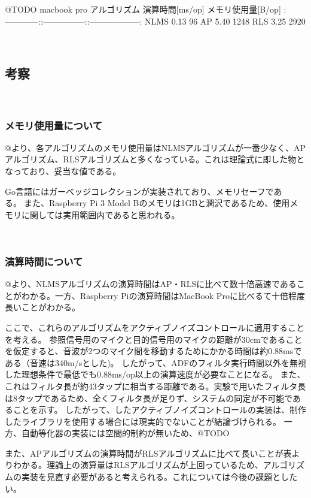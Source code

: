 @TODO macbook pro \textbar{} アルゴリズム \textbar{} 演算時間{[}ms/op{]}
\textbar{} メモリ使用量{[}B/op{]} \textbar{}
\textbar:------------:\textbar:---------------:\textbar:------------------:\textbar{}
\textbar{} NLMS \textbar{} 0.13 \textbar{} 96 \textbar{} \textbar{} AP
\textbar{} 5.40 \textbar{} 1248 \textbar{} \textbar{} RLS \textbar{}
3.25 \textbar{} 2920 \textbar{}

\
\subsection{考察}\label{consideration-color}

\
\subsubsection{メモリ使用量について}\label{about-memory}

@より、各アルゴリズムのメモリ使用量はNLMSアルゴリズムが一番少なく、APアルゴリズム、RLSアルゴリズムと多くなっている。これは理論式に即した物となっており、妥当な値である。

Go言語にはガーベッジコレクションが実装されており、メモリセーフである。また、Raspberry
Pi 3 Model
Bのメモリは1GBと潤沢であるため、使用メモリに関しては実用範囲内であると思われる。

\
\subsubsection{演算時間について}\label{about-time}

@より、NLMSアルゴリズムの演算時間はAP・RLSに比べて数十倍高速であることがわかる。一方、Raspberry
Piの演算時間はMacBook Proに比べるて十倍程度長いことがわかる。

ここで、これらのアルゴリズムをアクティブノイズコントロールに適用することを考える。
参照信号用のマイクと目的信号用のマイクの距離が30cmであることを仮定すると、音波が2つのマイク間を移動するためにかかる時間は約0.88msである（音速は340m/sとした)。
したがって、ADFのフィルタ実行時間以外を無視した理想条件で最低でも0.88ms/op以上の演算速度が必要なことになる。
また、これはフィルタ長が約43タップに相当する距離である。実験で用いたフィルタ長は8タップであるため、全くフィルタ長が足りず、システムの同定が不可能であることを示す。
したがって、したアクティブノイズコントロールの実装は、制作したライブラリを使用する場合には現実的でないことが結論づけられる。
一方、自動等化器の実装には空間的制約が無いため、@TODO

また、APアルゴリズムの演算時間がRLSアルゴリズムに比べて長いことが表よりわかる。理論上の演算量はRLSアルゴリズムが上回っているため、アルゴリズムの実装を見直す必要があると考えられる。これについては今後の課題としたい。
